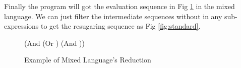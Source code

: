 Finally the program  will got the evaluation sequence in Fig \ref{fig:mixexec} in the mixed language. We can just filter the intermediate sequences without  in any sub-expressions to get the resugaring sequence as Fig \ref{fig:standard}.

\begin{figure}[thb]
\begin{center}
\begin{scriptsize}
\begin{Codes}
    (And (Or \true \false) (And \false \true))
\OneStep{ \false}
\end{Codes}
\end{scriptsize}
\end{center}
\caption{Example of Mixed Language's Reduction}
\label{fig:mixexec}
\end{figure}